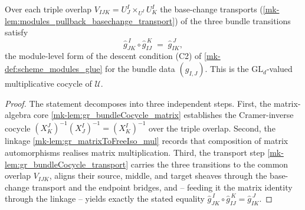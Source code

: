 \begin{lemma}\label{mk-lem:gr_bundleCocycle_mul}
  \leanok

  Over each triple overlap \(V_{IJK} = U^I_J \times_{U^I} U^I_K\) the base-change transports
  (\ref{mk-lem:modules_pullback_basechange_transport}) of the three bundle transitions satisfy
  \[
    \widehat{g}_{JK}^{\,I} \circ \widehat{g}_{IJ}^{\,K}
      \;=\; \widehat{g}_{IK}^{\,J},
  \]
  the module-level form of the descent condition (C2) of \ref{mk-def:scheme_modules_glue} for
  the bundle data \((g_{I,J})\). This is the \(\mathrm{GL}_d\)-valued multiplicative cocycle
  of \(\mathcal{U}\).
\end{lemma}
\begin{proof}
  The statement decomposes into three independent steps. First, the matrix-algebra core
  \ref{mk-lem:gr_bundleCocycle_matrix} establishes the Cramer-inverse cocycle
  \((X^J_K)^{-1}(X^I_J)^{-1} = (X^I_K)^{-1}\) over the triple overlap. Second, the linkage
  \ref{mk-lem:gr_matrixToFreeIso_mul} records that composition of matrix automorphisms realises
  matrix multiplication. Third, the transport step \ref{mk-lem:gr_bundleCocycle_transport}
  carries the three transitions to the common overlap \(V_{IJK}\), aligns their source,
  middle, and target sheaves through the base-change transport and the endpoint bridges, and
  -- feeding it the matrix identity through the linkage -- yields exactly the stated equality
  \(\widehat{g}_{JK}^{\,I} \circ \widehat{g}_{IJ}^{\,K} = \widehat{g}_{IK}^{\,J}\).
\end{proof}

